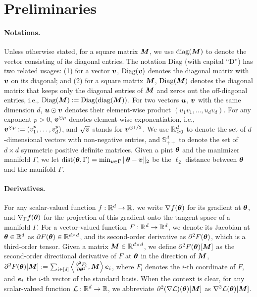 \vspace{-0.04in}
\section{Preliminaries}\label{sec:prelim}
\paragraph{Notations.}
Unless otherwise stated, for a square matrix ${\bm{M}}$, we use $\mathrm{diag}({\bm{M}})$ to denote the vector consisting of its diagonal entries. The notation $\mathrm{Diag}$ (with capital ``D'') has two related usages: (1) for a vector ${\bm{v}}$, $\mathrm{Diag}({\bm{v}})$ denotes the diagonal matrix with ${\bm{v}}$ on its diagonal; and (2) for a square matrix ${\bm{M}}$, $\mathrm{Diag}({\bm{M}})$ denotes the diagonal matrix that keeps only the diagonal entries of ${\bm{M}}$ and zeros out the off-diagonal entries, i.e., $\mathrm{Diag}({\bm{M}}) := \mathrm{Diag}(\mathrm{diag}({\bm{M}}))$. For two vectors ${\bm{u}}$, ${\bm{v}}$ with the same dimension $d$, ${\bm{u}} \odot {\bm{v}}$ denotes their element-wise product $(u_1v_1, \dots, u_d v_d)$. For any exponent $p > 0$, ${\bm{v}}^{\odot p}$ denotes element-wise exponentiation, i.e., $ {\bm{v}}^{\odot p} := (v_1^p, \dots, v_d^p)$, and $\sqrt{{\bm{v}}}$ stands for ${\bm{v}}^{\odot 1/2}$. We use $\mathbb{R}_{\ge 0}^{d}$ to denote the set of $d$-dimensional vectors with non-negative entries, and $\mathbb{S}^d_{++}$ to denote the set of $d \times d$ symmetric positive definite matrices. Given a pint ${\bm{\theta}}$ and the manimizer manifold $\Gamma$, we let $\mathrm{dist}({\bm{\theta}},\Gamma) = \min_{{\bm{v}} \in \Gamma} \|{\bm{\theta}} -{\bm{v}}\|_2$ be the $\ell_2$ distance between ${\bm{\theta}}$ and the manifold $\Gamma$.

\paragraph{Derivatives.}
For any scalar-valued function $f: \mathbb{R}^d \to \mathbb{R}$, we write $\nabla f({\bm{\theta}})$ for its gradient at ${\bm{\theta}}$, and $\nabla_{\Gamma} f({\bm{\theta}})$ for the projection of this gradient onto the tangent space of a manifold $\Gamma$.
For a vector-valued function $F: \mathbb{R}^d \to \mathbb{R}^d$, we denote its Jacobian at ${\bm{\theta}} \in \mathbb{R}^d$ as $\partial F({\bm{\theta}}) \in \mathbb{R}^{d \times d}$, and its second-order derivative as $\partial^2 F({\bm{\theta}})$, which is a third-order tensor. 
Given a matrix ${\bm{M}} \in \mathbb{R}^{d \times d}$, we define $\partial^2 F({\bm{\theta}})[{\bm{M}}]$ as the second-order directional derivative of $F$ at ${\bm{\theta}}$ in the direction of ${\bm{M}}$,
$\partial^2 F(\vtheta)[\mM] := \sum_{i \in [d]}\inp{\frac{\partial^2 F_i}{\partial\vtheta^2}}{\mM}\ve_i$,
where $F_i$ denotes the $i$-th coordinate of $F$, and $\ve_i$ the $i$-th vector of the standard basis. When the context is clear, 
for any scalar-valued function $\mathcal{L}: \mathbb{R}^d \to \mathbb{R}$, we abbreviate $\partial^2 (\nabla \mathcal{L})({\bm{\theta}})[{\bm{M}}]$ as $\nabla^3 \mathcal{L}({\bm{\theta}})[{\bm{M}}]$.

